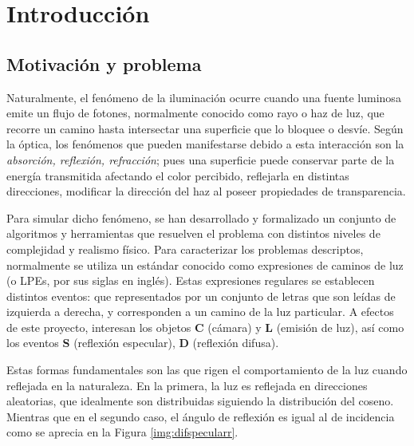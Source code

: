 \chapter{Introducción}
\label{ch:chap01}




\section{Motivación y problema}
\label{sec:motivacionYProblemas}

Naturalmente, el fenómeno de la iluminación ocurre cuando una fuente luminosa emite un flujo de fotones, normalmente conocido como rayo o haz de luz, que recorre un camino hasta intersectar una superficie que lo bloquee o desvíe. Según la óptica, los fenómenos que pueden manifestarse debido a esta interacción son la \textit{absorción, reflexión, refracción}; pues una superficie puede conservar parte de la energía transmitida afectando el color percibido, reflejarla en distintas direcciones, modificar la dirección del haz al poseer propiedades de transparencia.

Para simular dicho fenómeno, se han desarrollado y formalizado un conjunto de algoritmos y herramientas que resuelven el problema con distintos niveles de complejidad y realismo físico. Para caracterizar los problemas descriptos, normalmente se utiliza un estándar conocido como expresiones de caminos de luz \cite{LPE} (o LPEs, por sus siglas en inglés). Estas expresiones regulares se establecen distintos eventos: que representados por un conjunto de letras que son leídas de izquierda a derecha, y corresponden a un camino de la luz particular. A efectos de este proyecto, interesan los objetos \textbf{C} (cámara) y \textbf{L} (emisión de luz), así como los eventos \textbf{S} (reflexión especular),  \textbf{D} (reflexión difusa).

Estas formas fundamentales son las que rigen el comportamiento de la luz cuando reflejada en la naturaleza. En la primera, la luz es reflejada en direcciones aleatorias, que idealmente son distribuidas siguiendo la distribución del coseno. Mientras que en el segundo caso, el ángulo de reflexión es igual al de incidencia como se aprecia en la Figura \ref{img:difspecularr}.

